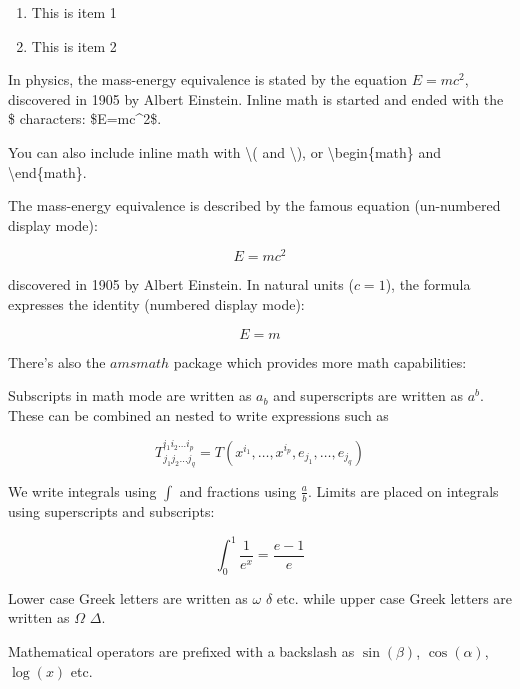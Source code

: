 \documentclass[11pt, letterpaper]{article}
\begin{document}
\begin{enumerate}
    \item This is item 1
    \item This is item 2
\end{enumerate}

In physics, the mass-energy equivalence is stated 
by the equation $E=mc^2$, discovered in 1905 by Albert Einstein. Inline math is started and ended with the \$ characters: \$E=mc\textasciicircum{2}\$.

You can also include inline math with \textbackslash( and \textbackslash), or \textbackslash{begin\{math\}} and \textbackslash{end\{math\}}.

The mass-energy equivalence is described by the famous equation (un-numbered display mode):

\[E=mc^2\]

discovered in 1905 by Albert Einstein. In natural units ($c = 1$), the formula expresses the identity (numbered display mode):

\begin{equation}
    E=m
\end{equation}

There's also the $amsmath$ package which provides more math capabilities:

Subscripts in math mode are written as $a_b$ and superscripts are written as $a^b$. These can be combined an nested to write expressions such as
 
$$T^{i_1 i_2 \dots i_p}_{j_1 j_2 \dots j_q} = T(x^{i_1},\dots,x^{i_p},e_{j_1},\dots,e_{j_q})$$
 
We write integrals using $\int$ and fractions using $\frac{a}{b}$. Limits are placed on integrals using superscripts and subscripts:
 
$$\int_0^1 \frac{1}{e^x} =  \frac{e-1}{e}$$
 
Lower case Greek letters are written as $\omega$ $\delta$ etc. while upper case Greek letters are written as $\Omega$ $\Delta$.
 
Mathematical operators are prefixed with a backslash as $\sin(\beta)$, $\cos(\alpha)$, $\log(x)$ etc.
\end{document}
